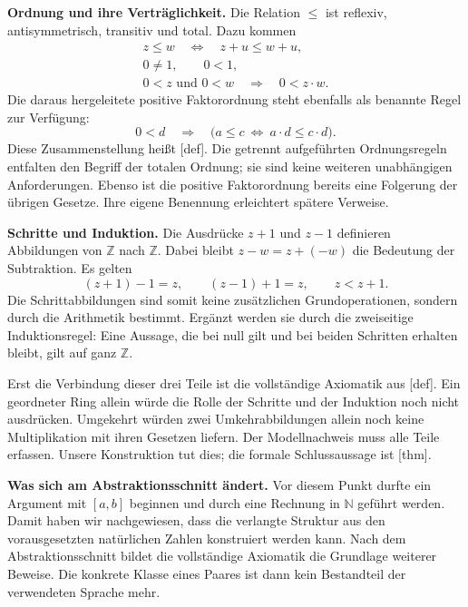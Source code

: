 \medskip\noindent\textbf{Ordnung und ihre Verträglichkeit.}
Die Relation \(\leq\) ist reflexiv, antisymmetrisch, transitiv
und total. Dazu kommen
\[
  \begin{gathered}
    z\leq w\quad\Longleftrightarrow\quad z+u\leq w+u,\\
    0\ne1,\qquad 0<1,\\
    0<z\text{ und }0<w\quad\Longrightarrow\quad0<z\cdot w.
  \end{gathered}
\]
Die daraus hergeleitete positive Faktorordnung steht ebenfalls
als benannte Regel zur Verfügung:
\[
  0<d\quad\Longrightarrow\quad
  \bigl(a\leq c\ \Longleftrightarrow\ a\cdot d\leq c\cdot d\bigr).
\]
Diese Zusammenstellung heißt
[def]. Die getrennt
aufgeführten Ordnungsregeln entfalten den Begriff der totalen
Ordnung; sie sind keine weiteren unabhängigen Anforderungen.
Ebenso ist die positive Faktorordnung bereits eine Folgerung
der übrigen Gesetze. Ihre eigene Benennung erleichtert spätere
Verweise.

\medskip\noindent\textbf{Schritte und Induktion.}
Die Ausdrücke \(z+1\) und \(z-1\) definieren Abbildungen von
\(\mathbb Z\) nach \(\mathbb Z\). Dabei bleibt
\(z-w=z+(-w)\) die Bedeutung der Subtraktion. Es gelten
\[
  (z+1)-1=z,\qquad (z-1)+1=z,\qquad z<z+1.
\]
Die Schrittabbildungen sind somit keine zusätzlichen
Grundoperationen, sondern durch die Arithmetik bestimmt. Ergänzt
werden sie durch die zweiseitige Induktionsregel: Eine Aussage,
die bei null gilt und bei beiden Schritten erhalten bleibt,
gilt auf ganz \(\mathbb Z\).

Erst die Verbindung dieser drei Teile ist die vollständige
Axiomatik aus [def]. Ein
geordneter Ring allein würde die Rolle der Schritte und der
Induktion noch nicht ausdrücken. Umgekehrt würden zwei
Umkehrabbildungen allein noch keine Multiplikation mit ihren
Gesetzen liefern. Der Modellnachweis muss alle Teile erfassen.
Unsere Konstruktion tut dies; die formale Schlussaussage ist
[thm].

\medskip\noindent\textbf{Was sich am Abstraktionsschnitt ändert.}
Vor diesem Punkt durfte ein Argument mit \([a,b]\) beginnen
und durch eine Rechnung in \(\mathbb N\) geführt werden.
Damit haben wir nachgewiesen, dass die verlangte Struktur
aus den vorausgesetzten natürlichen Zahlen konstruiert werden
kann. Nach dem Abstraktionsschnitt bildet die vollständige
Axiomatik die Grundlage weiterer Beweise. Die konkrete Klasse
eines Paares ist dann kein Bestandteil der verwendeten Sprache
mehr.

